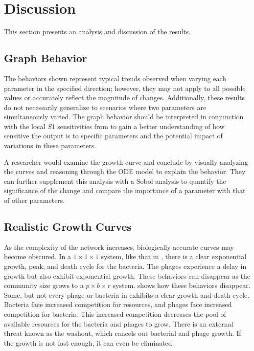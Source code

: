 \chapter{Discussion}
\label{Discussion}
This section presents an analysis and discussion of the results. 

\section{Graph Behavior}
The behaviors shown represent typical trends observed when varying each parameter in the specified direction; however, they may not apply to all possible values or accurately reflect the magnitude of changes. 
Additionally, these results do not necessarily generalize to scenarios where two parameters are simultaneously varied. 
The graph behavior should be interpreted in conjunction with the local $S1$ sensitivities from  to gain a better understanding of how sensitive the output is to specific parameters and the potential impact of variations in these parameters.

A researcher would examine the growth curve and conclude by visually analyzing the curves and reasoning through the ODE model to explain the behavior. 
They can further supplement this analysis with a Sobol analysis to quantify the significance of the change and compare the importance of a parameter with that of other parameters. 

\section{Realistic Growth Curves}
As the complexity of the network increases, biologically accurate curves may become obscured. 
In a $1\times 1\times 1$ system, like that in , there is a clear exponential growth, peak, and death cycle for the bacteria. 
The phages experience a delay in growth but also exhibit exponential growth. 
These behaviors can disappear as the community size grows to a $p\times b\times r$ system. 
 shows how these behaviors disappear. 
Some, but not every phage or bacteria in  exhibits a clear growth and death cycle. 
Bacteria face increased competition for resources, and phages face increased competition for bacteria. 
This increased competition decreases the pool of available resources for the bacteria and phages to grow. 
There is an external threat known as the washout, which cancels out bacterial and phage growth. If the growth is not fast enough, it can even be eliminated. 

